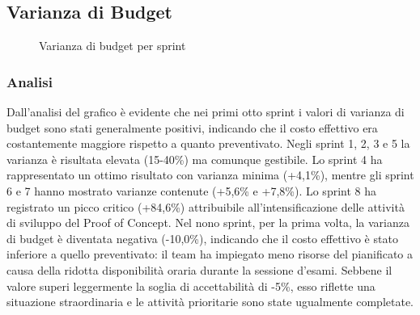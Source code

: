 \documentclass[a4paper,11pt,oneside]{scrartcl}
\begin{document}
\subsection{Varianza di Budget}

\begin{figure}[H]
\centering
{}
\caption{Varianza di budget per sprint}
\label{fig:varianza_budget}
\end{figure}

\subsubsection*{Analisi}

Dall'analisi del grafico è evidente che nei primi otto sprint i valori di varianza di budget sono stati generalmente positivi, indicando che il costo effettivo era costantemente maggiore rispetto a quanto preventivato. Negli sprint 1, 2, 3 e 5 la varianza è risultata elevata (15-40\%) ma comunque gestibile. Lo sprint 4 ha rappresentato un ottimo risultato con varianza minima (+4,1\%), mentre gli sprint 6 e 7 hanno mostrato varianze contenute (+5,6\% e +7,8\%). Lo sprint 8 ha registrato un picco critico (+84,6\%) attribuibile all'intensificazione delle attività di sviluppo del Proof of Concept. Nel nono sprint, per la prima volta, la varianza di budget è diventata negativa (-10,0\%), indicando che il costo effettivo è stato inferiore a quello preventivato: il team ha impiegato meno risorse del pianificato a causa della ridotta disponibilità oraria durante la sessione d'esami. Sebbene il valore superi leggermente la soglia di accettabilità di -5\%, esso riflette una situazione straordinaria e le attività prioritarie sono state ugualmente completate.
\end{document}

